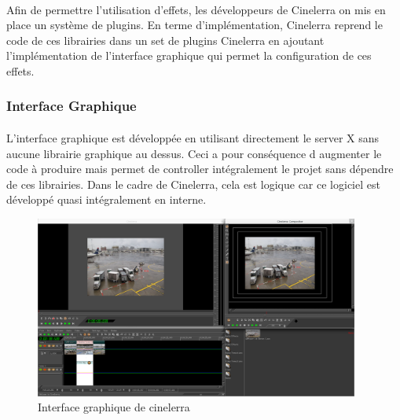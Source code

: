 \paragraph{}

Afin de permettre l'utilisation d'effets, les développeurs de Cinelerra
on mis en place un système de plugins. En terme d'implémentation,
Cinelerra reprend le code de ces librairies dans un set de plugins
Cinelerra en ajoutant l'implémentation de l'interface graphique qui
permet la configuration de ces effets.

\subsubsection{Interface Graphique}

\paragraph{}

L'interface graphique est développée en utilisant directement le server
X sans aucune librairie graphique au dessus. Ceci a pour conséquence
d augmenter le code à produire mais permet de controller intégralement
le projet sans dépendre de ces librairies.  Dans le cadre de Cinelerra,
cela est logique car ce logiciel est développé quasi intégralement
en interne.

\begin{figure} [H]

  \begin{center}

    \includegraphics[width=0.95\textwidth]{images/cinelerra}

  \end{center}

  \caption{Interface graphique de cinelerra}

  \label{Yes}

\end{figure}

